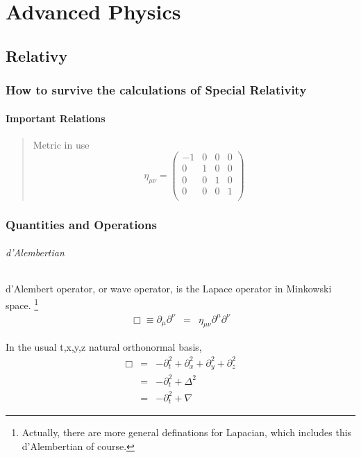 \documentclass[11pt]{book}
\begin{document}
\part{Advanced Physics}

\chapter{Relativy}
\section{How to survive the calculations of Special Relativity}

\subsection{Important Relations}
\begin{quotation}
Metric in use
\begin{equation}\eta_{\mu\nu}=\left(\begin{matrix}
	-1 & 0 & 0 & 0\\
	0 & 1 & 0 & 0\\
	0 & 0 & 1 & 0\\
	0 & 0 & 0 & 1\\
\end{matrix}\right)\end{equation}
\end{quotation}




\section{Quantities and Operations}

\paragraph{d'Alembertian}
d'Alembert operator, or wave operator, is the Lapace operator in Minkowski space.
\footnote{Actually, there are more general definations for Lapacian, which includes this d'Alembertian of course.}
\begin{eqnarray}
\Box\equiv \partial_\mu\partial^\nu&=&\eta_{\mu\nu}\partial^\mu \partial^\nu
\end{eqnarray}

In the usual {t,x,y,z} natural orthonormal basis,
\begin{eqnarray}
 \Box&=&-\partial_t^2+\partial_x^2+\partial_y^2+\partial_z^2 \\
&=&-\partial_t^2+\Delta^2 \\
&=&-\partial_t^2+\nabla
\end{eqnarray}
\end{document}
